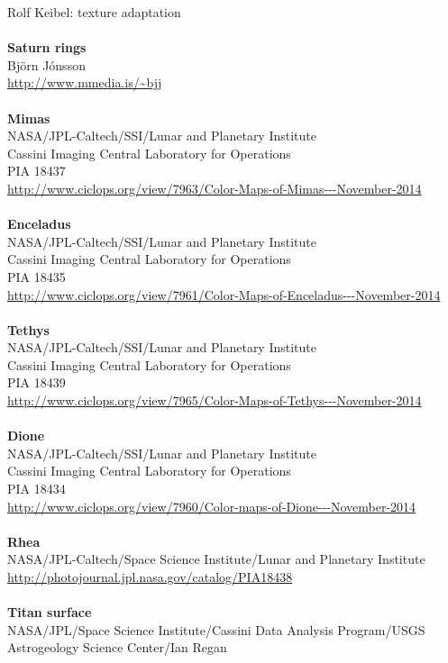 \documentclass[Orbiter User Manual.tex]{subfiles}
\begin{document}
Rolf Keibel: texture adaptation\\
\\
\textbf{Saturn rings}\\
Björn Jónsson\\
\url{http://www.mmedia.is/~bjj}\\
\\
\textbf{Mimas}\\
NASA/JPL-Caltech/SSI/Lunar and Planetary Institute\\
Cassini Imaging Central Laboratory for Operations\\
PIA 18437\\
\url{http://www.ciclops.org/view/7963/Color-Maps-of-Mimas---November-2014}\\
\\
\textbf{Enceladus}\\
NASA/JPL-Caltech/SSI/Lunar and Planetary Institute\\
Cassini Imaging Central Laboratory for Operations\\
PIA 18435\\
\url{http://www.ciclops.org/view/7961/Color-Maps-of-Enceladus---November-2014}\\
\\
\textbf{Tethys}\\
NASA/JPL-Caltech/SSI/Lunar and Planetary Institute\\
Cassini Imaging Central Laboratory for Operations\\
PIA 18439\\
\url{http://www.ciclops.org/view/7965/Color-Maps-of-Tethys---November-2014}\\
\\
\textbf{Dione}\\
NASA/JPL-Caltech/SSI/Lunar and Planetary Institute\\
Cassini Imaging Central Laboratory for Operations\\
PIA 18434\\
\url{http://www.ciclops.org/view/7960/Color-maps-of-Dione---November-2014}\\
\\
\textbf{Rhea}\\
NASA/JPL-Caltech/Space Science Institute/Lunar and Planetary Institute\\
\url{http://photojournal.jpl.nasa.gov/catalog/PIA18438}\\
\\
\textbf{Titan surface}\\
NASA/JPL/Space Science Institute/Cassini Data Analysis Program/USGS Astrogeology Science Center/Ian Regan\\
\end{document}
